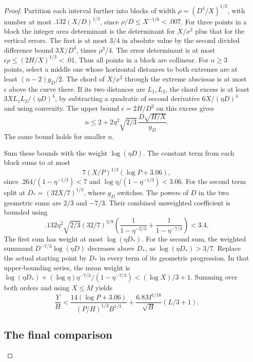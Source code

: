 \begin{proof}
Partition each interval further into blocks of width
\(\rho=(D^4/X)^{1/3}\), with number at most
\(.132(X/D)^{1/3}\), since \(\rho/D\le X^{-1/6}<.007\).
For three points in a block the integer area determinant
is the determinant for \(X/x^2\) plus that for the vertical
errors. The first is at most \(3/4\) in absolute value by
the second divided difference bound \(3X/D^4\), times
\(\rho^3/4\). The error determinant is at most
\(\epsilon\rho\le(2H/X)^{1/3}<.01\). Thus all points in a
block are collinear. For \(n\ge3\) points, select a middle
one whose horizontal distances to both extremes are at least
\((n-2)g_D/2\). The chord of \(X/x^2\) through the extreme
abscissas is at most \(\epsilon\) above the curve there.
If its two distances are \(L_1,L_2\), the chord excess is at
least \(3XL_1L_2/(\eta D)^4\), by subtracting a quadratic of
second derivative \(6X/(\eta D)^4\) and using convexity.
The upper bound \(\epsilon=2H/D^2\) on this excess gives
\[
 n\le 2+2\eta^2\sqrt{2/3}\,
                 \frac{D\sqrt{H/X}}{g_D}.
\]
The same bound holds for smaller \(n\).

Sum these bounds with the weight \(\log(\eta D)\).
The constant term from each block sums to at most
\[
 7(X/P)^{1/3}(\log P+3.06),
\]
since \(.264/(1-\eta^{-1/3})<7\) and
\(\log\eta/(1-\eta^{-1/3})<3.06\).
For the second term split at \(D_*=(32X/7)^{1/3}\),
where \(g_D\) switches. The powers of \(D\) in the two
geometric sums are \(2/3\) and \(-7/3\).
Their combined unweighted coefficient is bounded using
\[
 .132\eta^2\sqrt{2/3}(32/7)^{2/9}
 \left(\frac1{1-\eta^{-2/3}}+\frac1{1-\eta^{-7/3}}\right)<3.4 .
\]
The first sum has weight at most \(\log(\eta D_*)\).
For the second sum, the weighted summand \(D^{-7/3}\log(\eta D)\)
decreases above \(D_*\), as \(\log(\eta D_*)>3/7\).
Replace the actual starting point by \(D_*\) in every term of
its geometric progression. In that upper-bounding series, the
mean weight is
\(\log(\eta D_*)+(\log\eta)\eta^{-7/3}/(1-\eta^{-7/3})
<(\log X)/3+1\).
Summing over both orders and using \(X\le M\) yields
\begin{equation}\label{eq:large-square-charge}
 \frac{Y}{H}<
 \frac{14(\log P+3.06)}{(P/H)^{1/3}B^{1/3}}
 +\frac{6.8 M^{1/18}}{\sqrt H}(L/3+1).
\end{equation}

\subsection*{The final comparison}


\end{proof}
